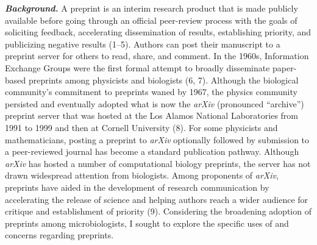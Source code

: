 \documentclass[11,]{article}
\begin{document}
\textbf{\emph{Background.}} A preprint is an interim research product
that is made publicly available before going through an official
peer-review process with the goals of soliciting feedback, accelerating
dissemination of results, establishing priority, and publicizing
negative results (1--5). Authors can post their manuscript to a preprint
server for others to read, share, and comment. In the 1960s, Information
Exchange Groups were the first formal attempt to broadly disseminate
paper-based preprints among physicists and biologists (6, 7). Although
the biological community's commitment to preprints waned by 1967, the
physics community persisted and eventually adopted what is now the
\emph{arXiv} (pronounced ``archive'') preprint server that was hosted at
the Los Alamos National Laboratories from 1991 to 1999 and then at
Cornell University (8). For some physicists and mathematicians, posting
a preprint to \emph{arXiv} optionally followed by submission to a
peer-reviewed journal has become a standard publication pathway.
Although \emph{arXiv} has hosted a number of computational biology
preprints, the server has not drawn widespread attention from
biologists. Among proponents of \emph{arXiv}, preprints have aided in
the development of research communication by accelerating the release of
science and helping authors reach a wider audience for critique and
establishment of priority (9). Considering the broadening adoption of
preprints among microbiologists, I sought to explore the specific uses
of and concerns regarding preprints.
\end{document}
